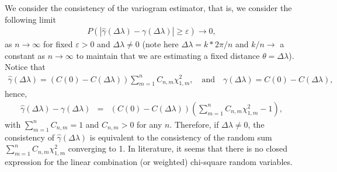 We consider the consistency of the variogram estimator, that is, we consider the following limit
\begin{eqnarray*}
P\left( \left|\hat{\gamma}(\Delta \lambda) - \gamma(\Delta \lambda)\right| \ge \varepsilon\right) \to 0,
\end{eqnarray*}
as $n \to \infty$ for fixed $\varepsilon > 0$ and $\Delta \lambda \ne 0$ (note here $\Delta \lambda = k*2\pi/n$ and $k/n  \to $ a constant as $n \to \infty$ to maintain that we are estimating a fixed distance $\theta = \Delta \lambda$). Notice that
\begin{eqnarray*}
\hat{\gamma}(\Delta \lambda) = (C(0) - C(\Delta \lambda))\sum_{m = 1}^n C_{n,m} \chi_{1,m}^2, \quad \mbox{and} \quad \gamma(\Delta \lambda) = C(0) - C(\Delta \lambda),
\end{eqnarray*}
hence,
\begin{eqnarray*}
\hat{\gamma}(\Delta \lambda) - \gamma(\Delta \lambda) &=& (C(0) - C(\Delta \lambda))\left(\sum_{m = 1}^n C_{n,m} \chi_{1,m}^2 - 1\right),
\end{eqnarray*}
with $\sum_{m = 1}^n C_{n, m} = 1$ and $C_{n, m} > 0$ for any $n$. Therefore, if $\Delta \lambda \ne 0$, the consistency of $\hat{\gamma}(\Delta \lambda)$ is equivalent to the consistency of the random sum $\sum_{m = 1}^n C_{n,m} \chi_{1,m}^2$ converging to 1. In literature, it seems that there is no closed expression for the linear combination (or weighted) chi-square random variables. \\


